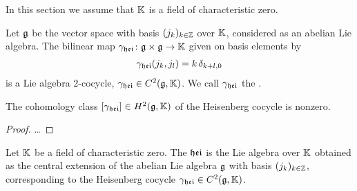 In this section we assume that $\mathbb{K}$ is a field of characteristic zero.

\begin{definition}
  \label{def:HeisenbergCocycle}
  \leanok
  Let $\mathfrak{g}$ be the vector space with basis $(j_k)_{k \in \mathbb{Z}}$ over $\mathbb{K}$,
  considered as an abelian Lie algebra.
  The bilinear map ${\gamma}_{\mathfrak{hei}} \colon \mathfrak{g} \times \mathfrak{g} \to \mathbb{K}$
  given on basis elements by
  \begin{align*}
    {\gamma}_{\mathfrak{hei}}(j_k, j_l) = k \, \delta_{k+l,0}
  \end{align*}
  is a Lie algebra 2-cocycle, ${\gamma}_{\mathfrak{hei}} \in C^2(\mathfrak{g},\mathbb{K})$.
  We call ${\gamma}_{\mathfrak{hei}}$ the .
\end{definition}

\begin{lemma}
  \label{lem:HeisenbergCocycleNontrivial}
  \leanok
  The cohomology class $[{\gamma}_{\mathfrak{hei}}] \in H^2(\mathfrak{g},\mathbb{K})$
  of the Heisenberg cocycle is nonzero.
\end{lemma}
\begin{proof}
  \leanok
  \ldots
\end{proof}

\begin{definition}
  \label{def:HeisenbergAlgebra}
  \leanok
  Let $\mathbb{K}$ be a field of characteristic zero.
  The  $\mathfrak{hei}$ is the Lie algebra over $\mathbb{K}$
  obtained as the central extension of the abelian Lie algebra $\mathfrak{g}$
  with basis $(j_k)_{k \in \mathbb{Z}}$,
  corresponding to the Heisenberg cocycle ${\gamma}_{\mathfrak{hei}} \in C^2(\mathfrak{g},\mathbb{K})$.
\end{definition}
